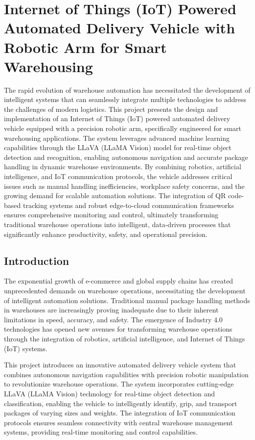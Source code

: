 \chapter{Internet of Things (IoT) Powered Automated Delivery Vehicle with Robotic Arm for Smart Warehousing}

The rapid evolution of warehouse automation has necessitated the development of intelligent systems that can seamlessly integrate multiple technologies to address the challenges of modern logistics. This project presents the design and implementation of an Internet of Things (IoT) powered automated delivery vehicle equipped with a precision robotic arm, specifically engineered for smart warehousing applications. The system leverages advanced machine learning capabilities through the LLaVA (LLaMA Vision) model for real-time object detection and recognition, enabling autonomous navigation and accurate package handling in dynamic warehouse environments. By combining robotics, artificial intelligence, and IoT communication protocols, the vehicle addresses critical issues such as manual handling inefficiencies, workplace safety concerns, and the growing demand for scalable automation solutions. The integration of QR code-based tracking systems and robust edge-to-cloud communication frameworks ensures comprehensive monitoring and control, ultimately transforming traditional warehouse operations into intelligent, data-driven processes that significantly enhance productivity, safety, and operational precision.

\section[Introduction]{\textbf{Introduction}}

The exponential growth of e-commerce and global supply chains has created unprecedented demands on warehouse operations, necessitating the development of intelligent automation solutions. Traditional manual package handling methods in warehouses are increasingly proving inadequate due to their inherent limitations in speed, accuracy, and safety. The emergence of Industry 4.0 technologies has opened new avenues for transforming warehouse operations through the integration of robotics, artificial intelligence, and Internet of Things (IoT) systems.

This project introduces an innovative automated delivery vehicle system that combines autonomous navigation capabilities with precision robotic manipulation to revolutionize warehouse operations. The system incorporates cutting-edge LLaVA (LLaMA Vision) technology for real-time object detection and classification, enabling the vehicle to intelligently identify, grip, and transport packages of varying sizes and weights. The integration of IoT communication protocols ensures seamless connectivity with central warehouse management systems, providing real-time monitoring and control capabilities.

